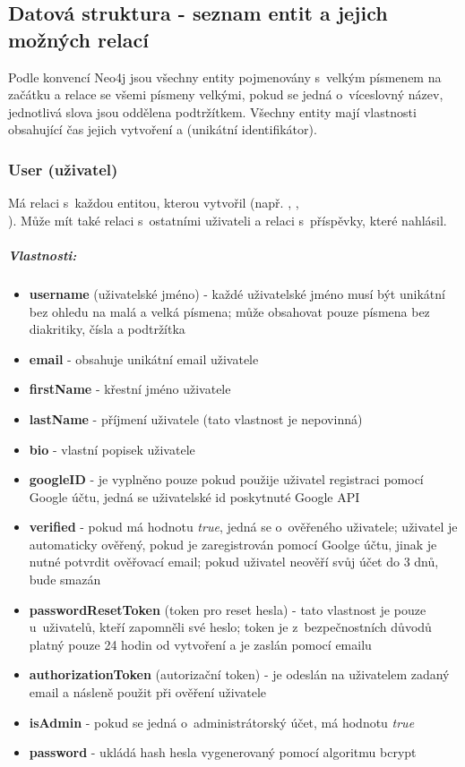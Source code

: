 \documentclass[12pt, a4paper,
  oneside,      %
]{report}
\newenvironment{propertiesItemize}{
\begin{itemize}{ 
  }}
  {\end{itemize}}
\begin{document}
\subsection{Datová struktura - seznam entit a jejich možných relací}
Podle konvencí Neo4j jsou všechny entity pojmenovány s~velkým písmenem na začátku a relace se všemi písmeny velkými, pokud se jedná o~víceslovný název, jednotlivá slova jsou oddělena podtržítkem. \cite{Neo4jNamingRules}
Všechny entity mají vlastnosti  obsahující čas jejich vytvoření a  (unikátní identifikátor).

\subsubsection{User (uživatel)}  Má relaci  s~každou entitou, kterou vytvořil (např. , ,\\ ). Může mít také relaci  s~ostatními uživateli a relaci  s~příspěvky, které nahlásil.
\subparagraph{Vlastnosti:}
\begin{propertiesItemize}
	\item \textbf{username} (uživatelské jméno) - každé uživatelské jméno musí být unikátní bez ohledu na malá a velká písmena; může obsahovat pouze písmena bez diakritiky, čísla a podtržítka
	\item \textbf{email} - obsahuje unikátní email uživatele
	\item \textbf{firstName} - křestní jméno uživatele
	\item \textbf{lastName} - příjmení uživatele (tato vlastnost je nepovinná)
	\item \textbf{bio} - vlastní popisek uživatele
	\item \textbf{googleID} - je vyplněno pouze pokud použije uživatel registraci pomocí Google účtu, jedná se uživatelské id poskytnuté Google API
	\item \textbf{verified} - pokud má hodnotu \textit{true}, jedná se o~ověřeného uživatele; uživatel je automaticky ověřený, pokud je zaregistrován pomocí Goolge účtu, jinak je nutné potvrdit ověřovací email; pokud uživatel neověří svůj účet do 3 dnů, bude smazán
	\item \textbf{passwordResetToken} (token pro reset hesla) - tato vlastnost je pouze u~uživatelů, kteří zapomněli své heslo; token je z~bezpečnostních důvodů platný pouze 24 hodin od vytvoření a je zaslán pomocí emailu
	\item \textbf{authorizationToken} (autorizační token) - je odeslán na uživatelem zadaný email a násleně použit při ověření uživatele
	\item \textbf{isAdmin} - pokud se jedná o~administrátorský účet, má hodnotu \textit{true}
	\item \textbf{password} - ukládá hash hesla vygenerovaný pomocí algoritmu bcrypt
\end{propertiesItemize}
\end{document}
